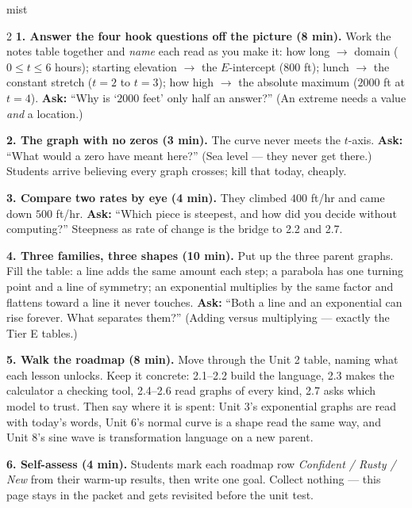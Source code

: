 \documentclass[10pt]{article}
\begin{document}
\boxguard
\begin{skillbox}[Lesson]{mist}
\begin{multicols}{2}
\textbf{1. Answer the four hook questions off the picture (8 min).} Work the notes table together
and \emph{name} each read as you make it: how long $\to$ domain ($0 \le t \le 6$ hours); starting
elevation $\to$ the $E$-intercept ($800$ ft); lunch $\to$ the constant stretch ($t=2$ to $t=3$);
how high $\to$ the absolute maximum ($2000$ ft at $t=4$). \textbf{Ask:} ``Why is `$2000$ feet' only
half an answer?'' (An extreme needs a value \emph{and} a location.)

\textbf{2. The graph with no zeros (3 min).} The curve never meets the $t$-axis. \textbf{Ask:}
``What would a zero have meant here?'' (Sea level --- they never get there.) Students arrive
believing every graph crosses; kill that today, cheaply.

\textbf{3. Compare two rates by eye (4 min).} They climbed $400$ ft/hr and came down $500$ ft/hr.
\textbf{Ask:} ``Which piece is steepest, and how did you decide without computing?'' Steepness as
rate of change is the bridge to 2.2 and 2.7.

\textbf{4. Three families, three shapes (10 min).} Put up the three parent graphs. Fill the table:
a line adds the same amount each step; a parabola has one turning point and a line of symmetry; an
exponential multiplies by the same factor and flattens toward a line it never touches.
\textbf{Ask:} ``Both a line and an exponential can rise forever. What separates them?'' (Adding
versus multiplying --- exactly the Tier E tables.)

\textbf{5. Walk the roadmap (8 min).} Move through the Unit 2 table, naming what each lesson
unlocks. Keep it concrete: 2.1--2.2 build the language, 2.3 makes the calculator a checking tool,
2.4--2.6 read graphs of every kind, 2.7 asks which model to trust. Then say where it is spent:
Unit 3's exponential graphs are read with today's words, Unit 6's normal curve is a shape read the
same way, and Unit 8's sine wave is transformation language on a new parent.

\textbf{6. Self-assess (4 min).} Students mark each roadmap row \emph{Confident / Rusty / New}
from their warm-up results, then write one goal. Collect nothing --- this page stays in the packet
and gets revisited before the unit test.
\end{multicols}
\end{skillbox}
\end{document}
